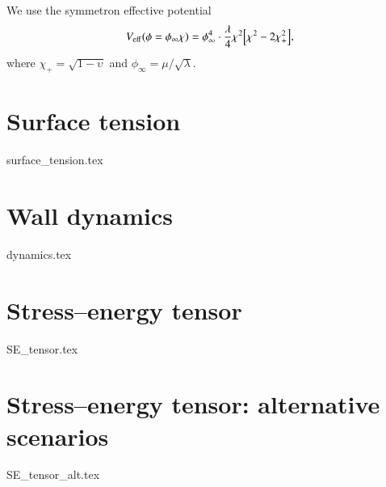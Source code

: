 We use the symmetron effective potential
\begin{equation}\label{eq:walls:symmetron_effective_potential}
    V_\mathrm{eff}(\phi=\phi_\infty \chi) = \phi_{\infty}^4 \cdot \frac{\lambda}{4} \chi^2 {\left[ \chi^2 - 2\chi_+^2 \right]},
\end{equation}
where $\chi_+ = \sqrt{1-\upsilon}$ and $\phi_\infty=\mu/\sqrt{\lambda}$.




\section{Surface tension}\label{app:walls:surface_tension}
    {{surface_tension.tex}}


\section{Wall dynamics}\label{app:walls:dynamics}
    {{dynamics.tex}}

\section{Stress--energy tensor}\label{app:walls:SE_tensor}
    {{SE_tensor.tex}}
    
\section{Stress--energy tensor: alternative scenarios}\label{app:walls:SE_tensor_alt}
    {{SE_tensor_alt.tex}}


